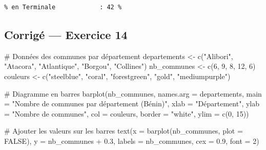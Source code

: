 \documentclass[
  french,
  11pt,
  a4paper,
]{article}
\newenvironment{Shaded}{}{}
\newcommand{\AttributeTok}[1]{\textcolor[rgb]{0.84,0.23,0.29}{#1}}
\newcommand{\CommentTok}[1]{\textcolor[rgb]{0.42,0.45,0.49}{#1}}
\newcommand{\ConstantTok}[1]{\textcolor[rgb]{0.00,0.36,0.77}{#1}}
\newcommand{\DecValTok}[1]{\textcolor[rgb]{0.00,0.36,0.77}{#1}}
\newcommand{\FloatTok}[1]{\textcolor[rgb]{0.00,0.36,0.77}{#1}}
\newcommand{\FunctionTok}[1]{\textcolor[rgb]{0.44,0.26,0.76}{#1}}
\newcommand{\NormalTok}[1]{\textcolor[rgb]{0.14,0.16,0.18}{#1}}
\newcommand{\OtherTok}[1]{\textcolor[rgb]{0.44,0.26,0.76}{#1}}
\newcommand{\SpecialCharTok}[1]{\textcolor[rgb]{0.00,0.36,0.77}{#1}}
\newcommand{\StringTok}[1]{\textcolor[rgb]{0.01,0.18,0.38}{#1}}
\begin{document}
\begin{verbatim}
% en Terminale            : 42 %
\end{verbatim}

\subsection{Corrigé --- Exercice 14}\label{corriguxe9-exercice-14}

\begin{Shaded}
\begin{Highlighting}[]
\CommentTok{\# Données des communes par département}
\NormalTok{departements }\OtherTok{\textless{}{-}} \FunctionTok{c}\NormalTok{(}\StringTok{"Alibori"}\NormalTok{, }\StringTok{"Atacora"}\NormalTok{, }\StringTok{"Atlantique"}\NormalTok{, }\StringTok{"Borgou"}\NormalTok{, }\StringTok{"Collines"}\NormalTok{)}
\NormalTok{nb\_communes }\OtherTok{\textless{}{-}} \FunctionTok{c}\NormalTok{(}\DecValTok{6}\NormalTok{, }\DecValTok{9}\NormalTok{, }\DecValTok{8}\NormalTok{, }\DecValTok{12}\NormalTok{, }\DecValTok{6}\NormalTok{)}
\NormalTok{couleurs }\OtherTok{\textless{}{-}} \FunctionTok{c}\NormalTok{(}\StringTok{"steelblue"}\NormalTok{, }\StringTok{"coral"}\NormalTok{, }\StringTok{"forestgreen"}\NormalTok{, }\StringTok{"gold"}\NormalTok{, }\StringTok{"mediumpurple"}\NormalTok{)}

\CommentTok{\# Diagramme en barres}
\FunctionTok{barplot}\NormalTok{(nb\_communes,}
        \AttributeTok{names.arg =}\NormalTok{ departements,}
        \AttributeTok{main =} \StringTok{"Nombre de communes par département (Bénin)"}\NormalTok{,}
        \AttributeTok{xlab =} \StringTok{"Département"}\NormalTok{,}
        \AttributeTok{ylab =} \StringTok{"Nombre de communes"}\NormalTok{,}
        \AttributeTok{col =}\NormalTok{ couleurs,}
        \AttributeTok{border =} \StringTok{"white"}\NormalTok{,}
        \AttributeTok{ylim =} \FunctionTok{c}\NormalTok{(}\DecValTok{0}\NormalTok{, }\DecValTok{15}\NormalTok{))}

\CommentTok{\# Ajouter les valeurs sur les barres}
\FunctionTok{text}\NormalTok{(}\AttributeTok{x =} \FunctionTok{barplot}\NormalTok{(nb\_communes, }\AttributeTok{plot =} \ConstantTok{FALSE}\NormalTok{),}
     \AttributeTok{y =}\NormalTok{ nb\_communes }\SpecialCharTok{+} \FloatTok{0.3}\NormalTok{,}
     \AttributeTok{labels =}\NormalTok{ nb\_communes,}
     \AttributeTok{cex =} \FloatTok{0.9}\NormalTok{, }\AttributeTok{font =} \DecValTok{2}\NormalTok{)}
\end{Highlighting}
\end{Shaded}
\end{document}
